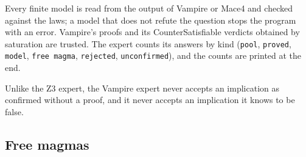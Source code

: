 \documentclass[11pt,a4paper]{article}
\theoremstyle{definition}
\theoremstyle{remark}
\newcommand{\code}[1]{\texttt{#1}}
\begin{document}
Every finite model is read from the output of Vampire or Mace4 and checked against the laws; a model that does not refute the question stops the program with an error. Vampire's proofs and its CounterSatisfiable verdicts obtained by saturation are trusted. The expert counts its answers by kind (\code{pool}, \code{proved}, \code{model}, \code{free magma}, \code{rejected}, \code{unconfirmed}), and the counts are printed at the end.

Unlike the Z3 expert, the Vampire expert never accepts an implication as confirmed without a proof, and it never accepts an implication it knows to be false.

\subsection{Free magmas}\label{sec:free}
\end{document}
